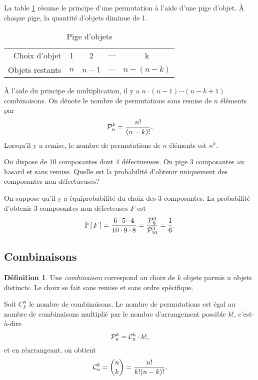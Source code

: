 \documentclass[11pt]{article}
\makeatletter
\newcommand\comb[2]{%
	\ensuremath{%
		\mathcal{C}_{#2}^{#1}%
	}%
}%
\newcommand\perm[2]{%
	\ensuremath{%
		\mathcal{P}_{#2}^{#1}%
	}%
}%
\renewcommand\P[1]{%
	\ensuremath{%
		\mathbb{P}\left[\,#1\,\right]%
	}%
}%
\theoremstyle{remark}
\theoremstyle{definition}
\newtheorem*{@definition}{Définition}
\newenvironment{definition}{%
	\begin{@definition}%
}{%
	\end{@definition}%
	\setcounter{property}{0}%
}
\makeatother
\begin{document}
La table \ref{tb:permutation} résume le principe d'une permutation à l'aide
d'une pige d'objet. À chaque pige, la quantité d'objets diminue de 1.

\begin{table}[H]
	\centering
	\caption{Pige d'objets}
	\begin{tabular}{r|cccc}
		\toprule
		Choix d'objet   &   1 &   2   & $\dots$ & k\\
		Objets restants & $n$ & $n-1$ & $\dots$ & $n-(n-k)$\\
		\bottomrule
	\end{tabular}
	\label{tb:permutation}
\end{table}

À l'aide du principe de multiplication, il y a $n\cdot(n-1)\cdots(n-k+1)$
combinaisons. On dénote le nombre de permutations sans remise de $n$ éléments
par
\begin{equation*}
	\perm{k}{n}=\frac{n!}{(n-k)!}.
\end{equation*}
Lorsqu'il y a remise, le nombre de permutations de $n$ éléments est $n^k$.

\begin{exemple}
	On dispose de 10 composantes dont 4 défectueuses. On pige 3 composantes au
	hasard et sans remise. Quelle est la probabilité d'obtenir uniquement des
	composantes non défectueuses?

	On suppose qu'il y a équiprobabilité du choix des 3 composantes. La
	probabilité d'obtenir 3 composantes non défecteuses $F$ est
	\begin{equation*}
		\P{F}
		=\frac{6\cdot 5\cdot 4}{10\cdot 9\cdot 8}
		=\frac{\perm{3}{6}}{\perm{3}{10}}
		=\frac{1}{6}.
	\end{equation*}
\end{exemple}

\subsection{Combinaisons}
\begin{definition}
	Une \textit{combinaison} correspond au choix de $k$ objets parmis $n$
	objets distincts. Le choix se fait sans remise et sans ordre spécifique.
\end{definition}

Soit $C_k^n$ le nombre de combinaisons. Le nombre de permutations est égal au
nombre de combinaisons multiplié par le nombre d'arrangement possible $k!$,
c'est-à-dire 
\begin{equation*}
	\perm{k}{n}=\comb{k}{n}\cdot k!,
\end{equation*}
et en réarrangeant, on obtient
\begin{equation*}
	\comb{k}{n}={{n}\choose{k}}=\frac{n!}{k!(n-k)!}.
\end{equation*}
\end{document}
